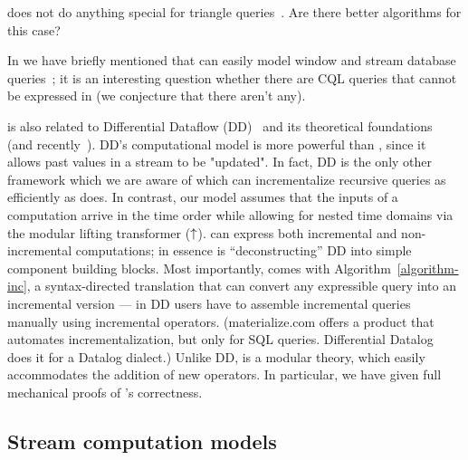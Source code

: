 \dbsp does not do anything special for triangle queries~\cite{kara-tds20}.  Are there
better algorithms for this case?

In  we have briefly mentioned that \dbsp can easily
model window and stream database queries~\cite{arasu-tr02,aurora}; it is an
interesting question whether there are CQL queries that cannot be expressed in \dbsp
(we conjecture that there aren't any).

\begin{comment}
The main problem that change structures address is that the types used in programs are not
closed under subtraction (e.g., the delta between two sets is not a set).
Although a relational \dbsp circuit computes
only on positive \zr values, its incremental version may compute on negative
values, but the equivalence of the two programs guarantees correctness even though the
type system of \zrs does not.  \val{Safe to delete this para}
\end{comment}


\dbsp is also related to Differential Dataflow
(DD)~\cite{mcsherry-cidr13, murray-sosp13} and its theoretical
foundations~\cite{abadi-fossacs15} (and
recently~\cite{mcsherry-vldb20,chothia-vldb16}).  DD's computational
model is more powerful than \dbsp, since it allows past values in a
stream to be "updated".  In fact, DD is the only other framework which
we are aware of which can incrementalize recursive queries as
efficiently as \dbsp does.  In contrast, our model assumes that the
inputs of a computation arrive in the time order while allowing for
nested time domains via the modular lifting transformer (${\uparrow}$).
\dbsp can express both incremental and non-incremental computations;
in essence \dbsp is ``deconstructing'' DD into simple component
building blocks.  Most importantly, \dbsp comes with
Algorithm~\ref{algorithm-inc}, a syntax-directed translation that can
convert any expressible query into an incremental version --- in DD
users have to assemble incremental queries manually using incremental
operators.  (materialize.com offers a product that automates
incrementalization, but only for SQL queries.  Differential
Datalog~\cite{ryzhyk-datalog19} does it for a Datalog dialect.)
Unlike DD, \dbsp is a modular theory, which easily accommodates the
addition of new operators.  In particular, we have given full
mechanical proofs of \dbsp's correctness.

\subsection{Stream computation models}

